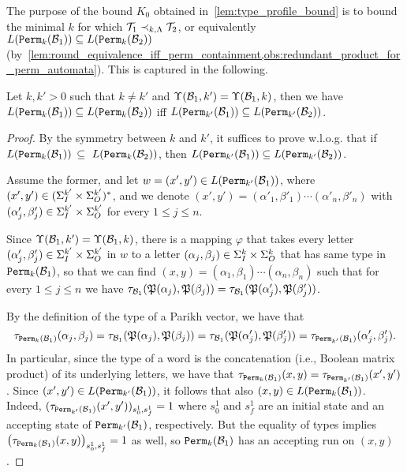 The purpose of the bound $K_0$ obtained in~\cref{lem:type_profile_bound} is to bound the minimal $k$ for which $\mathcal{T}_1\prec_{k,\Lambda} \mathcal{T}_2$, or equivalently $L({\mathtt{Perm}}_{k}(\mathcal{B}_1))\subseteq L({\mathtt{Perm}}_{k}(\mathcal{B}_2))$ (by~\cref{lem:round_equivalence_iff_perm_containment,obs:redundant_product_for_perm_automata}).
This is captured in the following.

\begin{lemma}
	\label{lem:profile_equality_to_simulation}
	Let $k,k'>0$ such that $k\neq k'$ and $\Upsilon(\mathcal{B}_1,k')=\Upsilon(\mathcal{B}_1,k)$, then we have
	$L({\mathtt{Perm}}_{k}(\mathcal{B}_1))\subseteq L({\mathtt{Perm}}_{k}(\mathcal{B}_2))$ iff $L({\mathtt{Perm}}_{k'}(\mathcal{B}_1))\subseteq L({\mathtt{Perm}}_{k'}(\mathcal{B}_2))$.
\end{lemma}
\begin{proof}

By the symmetry between $k$ and $k'$, it suffices to prove w.l.o.g. that if $L({\mathtt{Perm}}_{k}(\mathcal{B}_1))$ $\subseteq\  L({\mathtt{Perm}}_{k}(\mathcal{B}_2))$, then $L({\mathtt{Perm}}_{k'}(\mathcal{B}_1))\subseteq L({\mathtt{Perm}}_{k'}(\mathcal{B}_2))$.

Assume the former, and let $w=(x',y')\in L({\mathtt{Perm}}_{k'}(\mathcal{B}_1))$, where $(x',y')\in (\Sigma_{I}^{k'}\times \Sigma_{O}^{k'})^*$, and we denote $(x',y')=(\alpha'_1,\beta'_1)\cdots (\alpha'_n,\beta'_n)$ with $(\alpha'_j,\beta'_j)\in \Sigma_{I}^{k'}\times \Sigma_{O}^{k'}$ for every $1\le j\le n$. 

Since $\Upsilon(\mathcal{B}_1,k')=\Upsilon(\mathcal{B}_1,k)$, there is a mapping $\varphi$ that takes every letter $(\alpha_j',\beta_j')\in \Sigma_{I}^{k'}\times \Sigma_{O}^{k'}$ in $w$ to a letter $(\alpha_j,\beta_j)\in\Sigma_{I}^{k}\times \Sigma_{O}^{k}$ that has same type in ${\mathtt{Perm}}_{k}(\mathcal{B}_1)$, so that we can find $(x,y)=(\alpha_1,\beta_1)\cdots (\alpha_n,\beta_n)$ such that for every $1\le j\le n$ we have $\tau_{\mathcal{B}_1}(\mathfrak{P}(\alpha_j),\mathfrak{P}(\beta_j))=\tau_{\mathcal{B}_1}(\mathfrak{P}(\alpha'_j),\mathfrak{P}(\beta'_j))$. 

By the definition of the type of a Parikh vector, we have that \[\tau_{{\mathtt{Perm}}_k(\mathcal{B}_1)}(\alpha_j,\beta_j)=\tau_{\mathcal{B}_1}(\mathfrak{P}(\alpha_j),\mathfrak{P}(\beta_j))=\tau_{\mathcal{B}_1}(\mathfrak{P}(\alpha'_j),\mathfrak{P}(\beta'_j))=\tau_{{\mathtt{Perm}}_{k'}(\mathcal{B}_1)}(\alpha'_j,\beta'_j).\]
In particular, since the type of a word is the concatenation (i.e., Boolean matrix product) of its underlying letters, we have that $\tau_{{\mathtt{Perm}}_k(\mathcal{B}_1)}(x,y)=\tau_{{\mathtt{Perm}}_{k'}(\mathcal{B}_1)}(x',y')$. Since $(x',y')\in L({\mathtt{Perm}}_{k'}(\mathcal{B}_1))$, it follows that also $(x,y)\in L({\mathtt{Perm}}_{k}(\mathcal{B}_1))$. Indeed, 
$(\tau_{{\mathtt{Perm}}_{k'}(\mathcal{B}_1)}(x',y'))_{s^1_0,s^1_f}=1$ where $s^1_0$ and $s^1_f$ are an initial state and an accepting state of ${\mathtt{Perm}}_{k'}(\mathcal{B}_1)$, respectively. But the equality of types implies $\left(\tau_{{\mathtt{Perm}}_{k}(\mathcal{B}_1)}(x,y)\right)_{s^1_0,s^1_f}=1$ as well, so ${\mathtt{Perm}}_k(\mathcal{B}_1)$ has an accepting run on $(x,y)$.


\end{proof}

